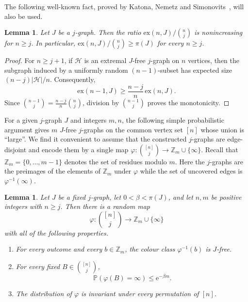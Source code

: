 \documentclass[12pt,a4paper]{article}
\numberwithin{equation}{section}
\newtheorem{lemma}[theorem]{Lemma}
\theoremstyle{definition}
\theoremstyle{remark}
\newcommand{\Z}[1]{\mathbb Z_{#1}}
\newcommand{\me}{\mathrm{e}}
\newcommand{\PP}{m}
\renewcommand{\longrightarrow}{\to}
\begin{document}
The following well-known fact, proved by Katona, Nemetz and Simonovits~\cite{KatonaNemetzSimonovits64}, will also be used.

\begin{lemma}\label{end:lem:finite-density}
Let $J$ be a $j$-graph. Then the ratio ${\mathrm{ex}(n,J)}/{\binom nj}$ is nonincreasing for $n\ge j$. In particular, $\mathrm{ex}(n,J)/\binom{n}{j}\ge \pi(J)$ for every $n\ge j$.
\end{lemma}

\begin{proof}
For $n\ge j+1$, if $\mathcal H$ is an extremal $J$-free $j$-graph on $n$ vertices, then the subgraph induced by a uniformly random $(n-1)$-subset has expected size
\(
 (n-j)|\mathcal H|/n.
\)
Consequently,
\[
 \mathrm{ex}(n-1,J)\ge\frac{n-j}{n}\,\mathrm{ex}(n,J).
\]
Since $\binom{n-1}j=\frac{n-j}{n}\binom nj$, division by $\binom{n-1}j$ proves the monotonicity.  
\end{proof}

For a given $j$-graph $J$ and integers $\PP,n$, 
the following simple probabilistic argument gives $\PP$ $J$-free $j$-graphs  on the common vertex set $[n]$ whose union is ``large''. We find it convenient to assume that the constructed $j$-graphs are edge-disjoint and encode them by a single map $\varphi:\binom{[n]}j\longrightarrow
\Z{\PP}\cup\{\infty\}$. Recall that $\Z{\PP}=\{0,\dots,\PP-1\}$ denotes the set of residues modulo $\PP$. Here the $j$-graphs are the preimages of the elements of $\Z{\PP}$ under $\varphi$ while the set of uncovered edges is $\varphi^{-1}(\infty)$.

\begin{lemma}\label{lem:app-global-colouring}
Let $J$ be a fixed $j$-graph, let $0<\beta<\pi(J)$, and let $n,\PP$ be positive integers with $n\ge j$.  Then there is a random map
\[
 \varphi:\binom{[n]}j\longrightarrow
 \Z{\PP}\cup\{\infty\}
\]
with all of the following properties.
\begin{enumerate}[label=\textup{(\roman*)}]
\item\label{it:JFree} For every outcome and every $b\in\Z{\PP}$, the colour class $\varphi^{-1}(b)$ is $J$-free.
\item\label{it:Uncovered} For every fixed $B\in\binom{[n]}j$,
\begin{equation*}
 \mathbb P(\varphi(B)=\infty)\le \me^{-\beta \PP}.
\end{equation*}
\item\label{it:Invariance} The distribution of $\varphi$ is invariant under every permutation of $[n]$.
\end{enumerate}
\end{lemma}
\end{document}
